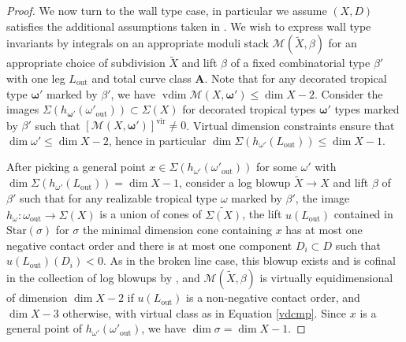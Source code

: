 \documentclass[12pt, oneside]{amsart}   	%
\newcommand{\vir}{\operatorname{vir}}
\newcommand{\vdim}{\operatorname{vdim}}
\newcommand{\out}{\operatorname{out}}
\numberwithin{equation}{section}
\numberwithin{thm}{section}
\numberwithin{figure}{section}
\begin{document}
\begin{proof}
We now turn to the wall type case, in particular we assume $(X,D)$ satisfies the additional assumptions taken in \cite{scatt}. We wish to express wall type invariants by integrals on an appropriate moduli stack $\mathscr{M}(\widetilde{X},\beta)$ for an appropriate choice of subdivision $\widetilde{X}$ and lift $\beta$ of a fixed combinatorial type $\beta'$ with one leg $L_{\out}$ and total curve class $\textbf{A}$. Note that for any decorated tropical type $\pmb\omega'$ marked by $\beta'$, we have $\vdim \mathscr{M}(X,\pmb\omega') \le \dim X - 2$. Consider the images $\Sigma(h_{\pmb\omega'}(\omega'_{\out})) \subset \Sigma(X)$ for decorated tropical types $\pmb\omega'$ types marked by $\beta'$ such that $[\mathscr{M}(X,\pmb\omega')]^{\vir} \not =0$. Virtual dimension constraints ensure that $\dim \omega' \le \dim X - 2$, hence in particular $\dim\Sigma(h_{\omega'}(L_{\out}))\le \dim X-1$. 

After picking a general point $x \in\Sigma(h_{\omega'}(\omega'_{\out}))$ for some $\omega'$ with $\dim\Sigma(h_{\omega'}(L_{\out}))= \dim X-1$, consider a log blowup $\widetilde{X} \rightarrow X$ and lift $\beta$ of $\beta'$ such that for any realizable tropical type $\omega$ marked by $\beta'$, the image $h_{\omega}: \omega_{\out} \rightarrow \Sigma(X)$ is a union of cones of $\widetilde{\Sigma(X)}$, the lift $u(L_{\out})$ contained in $\text{Star}(\sigma)$ for $\sigma$ the minimal dimension cone containing $x$ has at most one negative contact order and there is at most one component $D_i \subset D$ such that $u(L_{\out})(D_i) < 0$. As in the broken line case, this blowup exists and is cofinal in the collection of log blowups by \cite[Proposition $6.1$]{BNR2}, and $\mathscr{M}(\widetilde{X},\beta)$ is virtually equidimensional of dimension $\dim X - 2$ if $u(L_{\out})$ is a non-negative contact order, and $\dim X -3$ otherwise, with virtual class as in Equation \ref{vdcmp}. Since $x$ is a general point of $h_{\omega'}(\omega'_{\out})$, we have $\dim \sigma = \dim X - 1$.



\end{proof}
\end{document}
